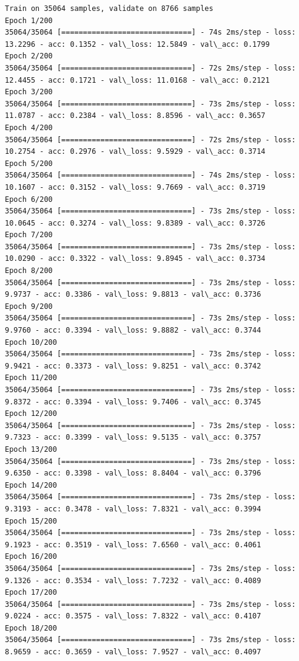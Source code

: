 \documentclass[11pt]{article}
\begin{document}
    \begin{Verbatim}[commandchars=\\\{\}]
Train on 35064 samples, validate on 8766 samples
Epoch 1/200
35064/35064 [==============================] - 74s 2ms/step - loss: 13.2296 - acc: 0.1352 - val\_loss: 12.5849 - val\_acc: 0.1799
Epoch 2/200
35064/35064 [==============================] - 72s 2ms/step - loss: 12.4455 - acc: 0.1721 - val\_loss: 11.0168 - val\_acc: 0.2121
Epoch 3/200
35064/35064 [==============================] - 73s 2ms/step - loss: 11.0787 - acc: 0.2384 - val\_loss: 8.8596 - val\_acc: 0.3657
Epoch 4/200
35064/35064 [==============================] - 72s 2ms/step - loss: 10.2754 - acc: 0.2976 - val\_loss: 9.5929 - val\_acc: 0.3714
Epoch 5/200
35064/35064 [==============================] - 74s 2ms/step - loss: 10.1607 - acc: 0.3152 - val\_loss: 9.7669 - val\_acc: 0.3719
Epoch 6/200
35064/35064 [==============================] - 73s 2ms/step - loss: 10.0645 - acc: 0.3274 - val\_loss: 9.8389 - val\_acc: 0.3726
Epoch 7/200
35064/35064 [==============================] - 73s 2ms/step - loss: 10.0290 - acc: 0.3322 - val\_loss: 9.8945 - val\_acc: 0.3734
Epoch 8/200
35064/35064 [==============================] - 73s 2ms/step - loss: 9.9737 - acc: 0.3386 - val\_loss: 9.8813 - val\_acc: 0.3736
Epoch 9/200
35064/35064 [==============================] - 73s 2ms/step - loss: 9.9760 - acc: 0.3394 - val\_loss: 9.8882 - val\_acc: 0.3744
Epoch 10/200
35064/35064 [==============================] - 73s 2ms/step - loss: 9.9421 - acc: 0.3373 - val\_loss: 9.8251 - val\_acc: 0.3742
Epoch 11/200
35064/35064 [==============================] - 73s 2ms/step - loss: 9.8372 - acc: 0.3394 - val\_loss: 9.7406 - val\_acc: 0.3745
Epoch 12/200
35064/35064 [==============================] - 73s 2ms/step - loss: 9.7323 - acc: 0.3399 - val\_loss: 9.5135 - val\_acc: 0.3757
Epoch 13/200
35064/35064 [==============================] - 73s 2ms/step - loss: 9.6350 - acc: 0.3398 - val\_loss: 8.8404 - val\_acc: 0.3796
Epoch 14/200
35064/35064 [==============================] - 73s 2ms/step - loss: 9.3193 - acc: 0.3478 - val\_loss: 7.8321 - val\_acc: 0.3994
Epoch 15/200
35064/35064 [==============================] - 73s 2ms/step - loss: 9.1923 - acc: 0.3519 - val\_loss: 7.6560 - val\_acc: 0.4061
Epoch 16/200
35064/35064 [==============================] - 73s 2ms/step - loss: 9.1326 - acc: 0.3534 - val\_loss: 7.7232 - val\_acc: 0.4089
Epoch 17/200
35064/35064 [==============================] - 73s 2ms/step - loss: 9.0224 - acc: 0.3575 - val\_loss: 7.8322 - val\_acc: 0.4107
Epoch 18/200
35064/35064 [==============================] - 73s 2ms/step - loss: 8.9659 - acc: 0.3659 - val\_loss: 7.9527 - val\_acc: 0.4097

\end{Verbatim}
\end{document}
